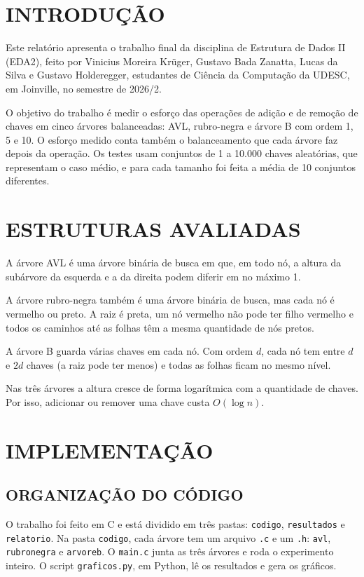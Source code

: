 \section{INTRODUÇÃO}

Este relatório apresenta o trabalho final da disciplina de Estrutura de Dados II (EDA2), feito por Vinicius Moreira Krüger, Gustavo Bada Zanatta, Lucas da Silva e Gustavo Holderegger, estudantes de Ciência da Computação da UDESC, em Joinville, no semestre de 2026/2.

O objetivo do trabalho é medir o esforço das operações de adição e de remoção de chaves em cinco árvores balanceadas: AVL, rubro-negra e árvore B com ordem 1, 5 e 10. O esforço medido conta também o balanceamento que cada árvore faz depois da operação. Os testes usam conjuntos de 1 a 10.000 chaves aleatórias, que representam o caso médio, e para cada tamanho foi feita a média de 10 conjuntos diferentes.

\section{ESTRUTURAS AVALIADAS}

A árvore AVL é uma árvore binária de busca em que, em todo nó, a altura da subárvore da esquerda e a da direita podem diferir em no máximo 1.

A árvore rubro-negra também é uma árvore binária de busca, mas cada nó é vermelho ou preto. A raiz é preta, um nó vermelho não pode ter filho vermelho e todos os caminhos até as folhas têm a mesma quantidade de nós pretos.

A árvore B guarda várias chaves em cada nó. Com ordem $d$, cada nó tem entre $d$ e $2d$ chaves (a raiz pode ter menos) e todas as folhas ficam no mesmo nível.

Nas três árvores a altura cresce de forma logarítmica com a quantidade de chaves. Por isso, adicionar ou remover uma chave custa $O(\log n)$.

\section{IMPLEMENTAÇÃO}

\subsection{ORGANIZAÇÃO DO CÓDIGO}

O trabalho foi feito em C e está dividido em três pastas: \texttt{codigo}, \texttt{resultados} e \texttt{relatorio}. Na pasta \texttt{codigo}, cada árvore tem um arquivo \texttt{.c} e um \texttt{.h}: \texttt{avl}, \texttt{rubronegra} e \texttt{arvoreb}. O \texttt{main.c} junta as três árvores e roda o experimento inteiro. O script \texttt{graficos.py}, em Python, lê os resultados e gera os gráficos.

